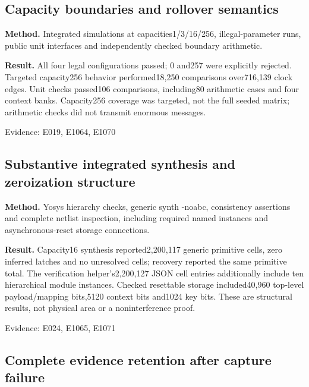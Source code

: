 \documentclass[11pt,a4paper]{article}
\begin{document}
\subsection{Capacity boundaries and rollover semantics}

\textbf{Method.} Integrated simulations at capacities1/\allowbreak{}3/\allowbreak{}16/\allowbreak{}256,\allowbreak{} illegal-parameter runs,\allowbreak{} public unit interfaces and independently checked boundary arithmetic.

\textbf{Result.} All four legal configurations passed; 0 and257 were explicitly rejected. Targeted capacity256 behavior performed18,\allowbreak{}250 comparisons over716,\allowbreak{}139 clock edges. Unit checks passed106 comparisons,\allowbreak{} including80 arithmetic cases and four context banks. Capacity256 coverage was targeted,\allowbreak{} not the full seeded matrix; arithmetic checks did not transmit enormous messages.

{\small Evidence: E019,\allowbreak{} E1064,\allowbreak{} E1070}

\subsection{Substantive integrated synthesis and zeroization structure}

\textbf{Method.} Yosys hierarchy checks,\allowbreak{} generic synth -noabc,\allowbreak{} consistency assertions and complete netlist inspection,\allowbreak{} including required named instances and asynchronous-reset storage connections.

\textbf{Result.} Capacity16 synthesis reported2,\allowbreak{}200,\allowbreak{}117 generic primitive cells,\allowbreak{} zero inferred latches and no unresolved cells; recovery reported the same primitive total. The verification helper's2,\allowbreak{}200,\allowbreak{}127 JSON cell entries additionally include ten hierarchical module instances. Checked resettable storage included40,\allowbreak{}960 top-level payload/\allowbreak{}mapping bits,\allowbreak{}5120 context bits and1024 key bits. These are structural results,\allowbreak{} not physical area or a noninterference proof.

{\small Evidence: E024,\allowbreak{} E1065,\allowbreak{} E1071}

\subsection{Complete evidence retention after capture failure}
\end{document}
